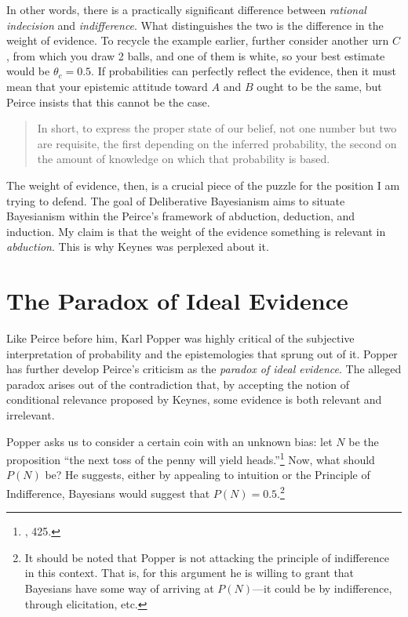 In other words, there is a practically significant difference between
\emph{rational indecision} and \emph{indifference}. What distinguishes
the two is the difference in the weight of evidence. To recycle the
example earlier, further consider another urn \(C\), from which you draw
2 balls, and one of them is white, so your best estimate would be
\(\theta_c = 0.5\). If probabilities can perfectly reflect the evidence,
then it must mean that your epistemic attitude toward \(A\) and \(B\)
ought to be the same, but Peirce insists that this cannot be the case.

\begin{quote}
In short, to express the proper state of our belief, not one number but
two are requisite, the first depending on the inferred probability, the
second on the amount of knowledge on which that probability is based.
\end{quote}

The weight of evidence, then, is a crucial piece of the puzzle for the
position I am trying to defend. The goal of Deliberative Bayesianism
aims to situate Bayesianism within the Peirce's framework of abduction,
deduction, and induction. My claim is that the weight of the evidence something is relevant in \emph{abduction}. This is why Keynes was perplexed about it. 

\hypertarget{the-paradox-of-ideal-evidence-1}{%
\section{The Paradox of Ideal
Evidence}\label{the-paradox-of-ideal-evidence-1}}

Like Peirce before him, Karl Popper was highly critical of the
subjective interpretation of probability and the epistemologies that
sprung out of it. Popper has further develop Peirce's criticism as the
\emph{paradox of ideal evidence}. The alleged paradox arises out of the
contradiction that, by accepting the notion of conditional relevance
proposed by Keynes, some evidence is both relevant and irrelevant.

Popper asks us to consider a certain coin with an unknown bias: let
\(N\) be the proposition ``the next toss of the penny will yield
heads.''\footnote{\cite{popperlogic}, 425.}
Now, what should \(P(N)\) be? He suggests, either by appealing to
intuition or the Principle of Indifference, Bayesians would suggest that
\(P(N) = 0.5\).\footnote{It should be noted that Popper is not attacking
  the principle of indifference in this context. That is, for this
  argument he is willing to grant that Bayesians have some way of
  arriving at \(P(N)\)---it could be by indifference, through
  elicitation, etc.}

